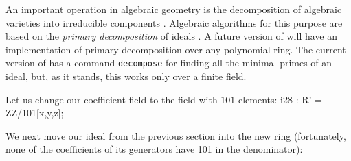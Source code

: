 An important operation in algebraic geometry is 
the decomposition of algebraic varieties
into irreducible components \cite[\S 4.6]{CLO1}.
Algebraic algorithms for this purpose are based on the
{\it primary decomposition} of ideals \cite[\S 4.7]{CLO1}.
A future version of \Mtwo will have an implementation of
primary decomposition over any polynomial ring.
The current version of \Mtwo has a command
{\tt decompose} for finding all the minimal primes of an ideal,
but, as it stands, this works only over a finite field.

Let us change our coefficient field to the field with $101$ elements:
\beginOutput
i28 : R' = ZZ/101[x,y,z];\\
\endOutput

We next move our ideal from the previous section into the new ring
(fortunately, none of the coefficients of its generators have 101 in the
denominator):

